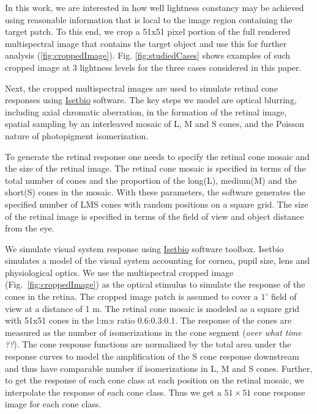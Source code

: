 \documentclass{jov}
\begin{document}
In this work, we are interested in how well lightness constancy may be achieved using reasonable information that is local to the image region containing the target patch. 
To this end, we crop a 51x51 pixel portion of the full rendered multispectral image that contains the target object and use this for further analysis (\ref{fig:croppedImage}).
Fig. \ref{fig:studiedCases} shows examples of such cropped image at 3 lightness levels for the three cases considered in this paper.

Next, the cropped multispectral images are used to simulate retinal cone responses using \href{https://github.com/isetbio}{Isetbio} software. The key steps we model are optical blurring, including axial chromatic aberration, in the formation of the retinal image, spatial sampling by an interleaved mosaic of L, M and S cones, and the Poisson nature of photopigment isomerization.  

To generate the retinal response one needs to specify the retinal cone mosaic and the size of the retinal image. The retinal cone mosaic is specified in terms of the total number of cones and the proportion of the long(L), medium(M) and the short(S) cones in the mosaic. With these parameters, the software generates the specified number of LMS cones with random positions on a square grid. The size of the retinal image is specified in terms of the field of view and object distance from the eye. 


We simulate visual system response using \href{http://isetbio.org}{Isetbio} software toolbox. Isetbio simulates a model of the visual system accounting for cornea, pupil size, lens and physiological optics. We use the multispectral cropped image (Fig.~\ref{fig:croppedImage}) as the optical stimulus to simulate the response of the cones in the retina. The cropped image patch is assumed to cover a $1^{\circ}$ field of view at a distance of 1 m. The retinal cone mosaic is modeled as a square grid with 51x51 cones in the l:m:s ratio 0.6:0.3:0.1. The response of the cones are measured as the number of isomerizations in the cone segment ({\it over what time ??}). The cone response functions are normalized by the total area under the response curves to model the amplification of the S cone response downstream and thus have comparable number if isomerizations in L, M and S cones. Further, to get the response of each cone class at each position on the retinal mosaic, we interpolate the response of each cone class. Thus we get a $51 \times 51$ cone response image for each cone class.
\end{document}
